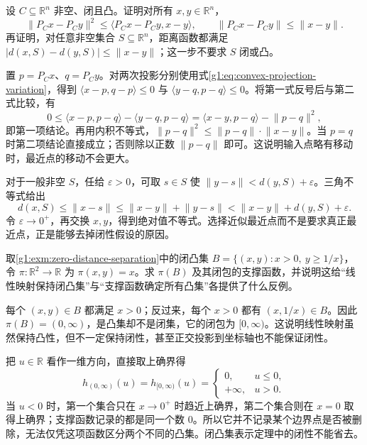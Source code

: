 \begin{exercise}\label{g1:ex:nonexpansive-projection}
	设 \(C\subseteq\mathbb R^n\) 非空、闭且凸。证明对所有 \(x,y\in\mathbb R^n\)，
	\[
		\lVert P_Cx-P_Cy\rVert^2\leq\langle P_Cx-P_Cy,x-y\rangle,
		\qquad\lVert P_Cx-P_Cy\rVert\leq\lVert x-y\rVert.
	\]
	再证明，对任意非空集合 \(S\subseteq\mathbb R^n\)，距离函数都满足 \(\lvert d(x,S)-d(y,S)\rvert\leq\lVert x-y\rVert\)；这一步不要求 \(S\) 闭或凸。
\end{exercise}
\begin{solution}
	置 \(p=P_Cx\)、\(q=P_Cy\)。对两次投影分别使用式\eqref{g1:eq:convex-projection-variation}，得到 \(\langle x-p,q-p\rangle\leq0\) 与 \(\langle y-q,p-q\rangle\leq0\)。将第一式反号后与第二式比较，有
	\[
		0\leq\langle x-p,p-q\rangle-\langle y-q,p-q\rangle
		=\langle x-y,p-q\rangle-\lVert p-q\rVert^2,
	\]
	即第一项结论。再用内积不等式，\(\lVert p-q\rVert^2\leq\lVert p-q\rVert\cdot\lVert x-y\rVert\)。当 \(p=q\) 时第二项结论直接成立；否则除以正数 \(\lVert p-q\rVert\) 即可。这说明输入点略有移动时，最近点的移动不会更大。

	对于一般非空 \(S\)，任给 \(\varepsilon>0\)，可取 \(s\in S\) 使 \(\lVert y-s\rVert<d(y,S)+\varepsilon\)。三角不等式给出
	\[
		d(x,S)\leq\lVert x-s\rVert\leq\lVert x-y\rVert+\lVert y-s\rVert
		<\lVert x-y\rVert+d(y,S)+\varepsilon.
	\]
	令 \(\varepsilon\to0^+\)，再交换 \(x,y\)，得到绝对值不等式。选择近似最近点而不是要求真正最近点，正是能够去掉闭性假设的原因。
\end{solution}

\begin{exercise}\label{g1:ex:nonclosed-convex-image}
	取\cref{g1:exm:zero-distance-separation}中的闭凸集 \(B=\{(x,y):x>0,\ y\geq1/x\}\)，令 \(\pi:\mathbb R^2\rightarrow\mathbb R\) 为 \(\pi(x,y)=x\)。求 \(\pi(B)\) 及其闭包的支撑函数，并说明这给“线性映射保持闭凸集”与“支撑函数确定所有凸集”各提供了什么反例。
\end{exercise}
\begin{solution}
	每个 \((x,y)\in B\) 都满足 \(x>0\)；反过来，每个 \(x>0\) 都有 \((x,1/x)\in B\)。因此 \(\pi(B)=(0,\infty)\)，是凸集却不是闭集，它的闭包为 \([0,\infty)\)。这说明线性映射虽然保持凸性，但不一定保持闭性，甚至正交投影到坐标轴也不能保证闭性。

	把 \(u\in\mathbb R\) 看作一维方向，直接取上确界得
	\[
		h_{(0,\infty)}(u)=h_{[0,\infty)}(u)
		=\begin{cases}0,&u\leq0,\\+\infty,&u>0.\end{cases}
	\]
	当 \(u<0\) 时，第一个集合只在 \(x\to0^+\) 时趋近上确界，第二个集合则在 \(x=0\) 取得上确界；支撑函数记录的都是同一个数 \(0\)。所以它并不记录某个边界点是否被删除，无法仅凭这项函数区分两个不同的凸集。闭凸集表示定理中的闭性不能省去。
\end{solution}


